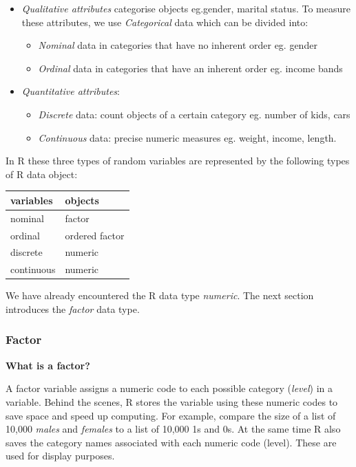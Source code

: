 \documentclass[
  letterpaper,
  DIV=11,
  numbers=noendperiod,
  oneside]{scrreprt}
\providecommand{\tightlist}{%
  \setlength{\itemsep}{0pt}\setlength{\parskip}{0pt}}\usepackage{longtable,booktabs,array}
\begin{document}
\begin{itemize}
\item
  \emph{Qualitative attributes} categorise objects eg.gender, marital
  status. To measure these attributes, we use \emph{Categorical} data
  which can be divided into:

  \begin{itemize}
  \tightlist
  \item
    \emph{Nominal} data in categories that have no inherent order eg.
    gender
  \item
    \emph{Ordinal} data in categories that have an inherent order eg.
    income bands
  \end{itemize}
\item
  \emph{Quantitative attributes}:

  \begin{itemize}
  \tightlist
  \item
    \emph{Discrete} data: count objects of a certain category eg. number
    of kids, cars
  \item
    \emph{Continuous} data: precise numeric measures eg. weight, income,
    length.
  \end{itemize}
\end{itemize}

In R these three types of random variables are represented by the
following types of R data object:

\begin{longtable}[]{@{}ll@{}}
\toprule\noalign{}
variables & objects \\
\midrule\noalign{}
\endhead
\bottomrule\noalign{}
\endlastfoot
nominal & factor \\
ordinal & ordered factor \\
discrete & numeric \\
continuous & numeric \\
\end{longtable}

We have already encountered the R data type \emph{numeric}. The next
section introduces the \emph{factor} data type.

\subsubsection{Factor}\label{factor}

\textbf{What is a factor?}

A factor variable assigns a numeric code to each possible category
(\emph{level}) in a variable. Behind the scenes, R stores the variable
using these numeric codes to save space and speed up computing. For
example, compare the size of a list of 10,000 \emph{males} and
\emph{females} to a list of 10,000 1s and 0s. At the same time R also
saves the category names associated with each numeric code (level).
These are used for display purposes.
\end{document}
